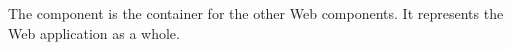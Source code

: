 
The  component is the container for the other Web components. It represents the Web application as a whole. 
